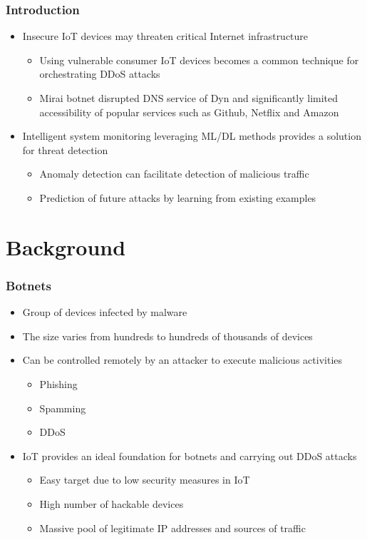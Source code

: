 \documentclass[10pt, presentation]{beamer}
\begin{document}
\begin{frame}
\frametitle{Introduction}
  \begin{itemize}
    \item Insecure IoT devices may threaten critical Internet infrastructure
      \begin{itemize}
          \item Using vulnerable consumer IoT devices becomes a common technique for orchestrating DDoS attacks
          \item Mirai botnet disrupted DNS service of Dyn and significantly limited accessibility of popular services such as Github, Netflix and Amazon
      \end{itemize}
      \item Intelligent system monitoring leveraging ML/DL methods provides a solution for threat detection
      \begin{itemize}
          \item Anomaly detection can facilitate detection of malicious traffic
          \item Prediction of future attacks by learning from existing examples
        \end{itemize}
  \end{itemize}
\end{frame}

\section{Background}

\begin{frame}
\frametitle{Botnets}
  \begin{itemize}
    \item Group of devices infected by malware
    \item The size varies from hundreds to hundreds of thousands of devices
    \item Can be controlled remotely by an attacker to execute malicious activities
    \begin{itemize}
          \item Phishing
          \item Spamming
          \item DDoS
      \end{itemize}
    \item IoT provides an ideal foundation for botnets and carrying out DDoS attacks
      \begin{itemize}
          \item Easy target due to low security measures in IoT
          \item High number of hackable devices
          \item Massive pool of legitimate IP addresses and sources of traffic
        \end{itemize}
  \end{itemize}
\end{frame}
\end{document}
